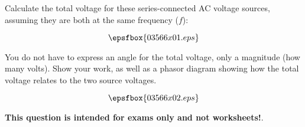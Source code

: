 

Calculate the total voltage for these series-connected AC voltage sources, assuming they are both at the same frequency ($f$):

$$\epsfbox{03566x01.eps}$$

You do not have to express an angle for the total voltage, only a magnitude (how many volts).  Show your work, as well as a phasor diagram showing how the total voltage relates to the two source voltages.

\vskip 30pt







$$\epsfbox{03566x02.eps}$$







{\bf This question is intended for exams only and not worksheets!}.



